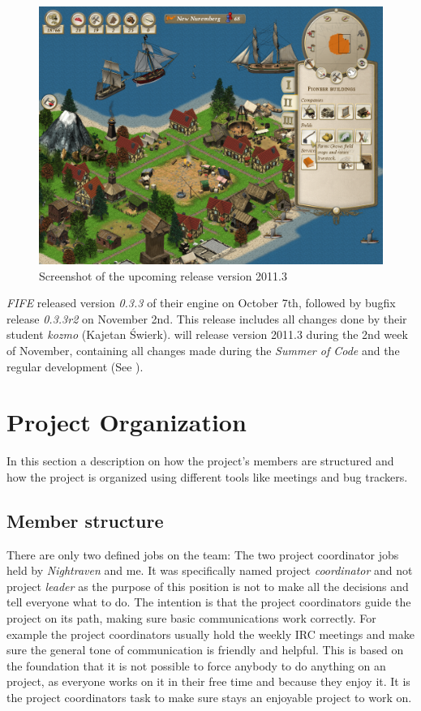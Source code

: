 \begin{figure}[!htb]
	\begin{center}
		\includegraphics[scale=0.28]{pics/uhscreenshot}
	\end{center}
    \caption{Screenshot of the upcoming \UH{} release version 2011.3}
    \label{uhscreenshot}
\end{figure}

\textit{FIFE} released version \textit{0.3.3} of their engine on October 7th,
followed by bugfix release \textit{0.3.3r2} on November 2nd. This release includes all changes done by their student
\textit{kozmo} (Kajetan Świerk). \UH{} will release \UH{} version 2011.3 during the 2nd week of November, containing all
changes made during the \textit{Summer of Code} and the regular development (See ).


\section{Project Organization}
In this section a description on how the project's members are structured and how the project is organized using
different tools like meetings and bug trackers.

\subsection{Member structure}
There are only two defined jobs on the team: The two project coordinator jobs held by \textit{Nightraven} and me. It was
specifically named project \textit{coordinator} and not project \textit{leader} as the purpose of this position is not to
make all the decisions and tell everyone what to do. The intention is that the project coordinators guide the project on
its path, making sure basic communications work correctly. For example the project coordinators usually hold the weekly
IRC meetings and make sure the general tone of communication is friendly and helpful. This is based on the foundation
that it is not possible to force anybody to do anything on an \OS{} project, as everyone works on it in their free time
and because they enjoy it. It is the project coordinators task to make sure stays an enjoyable project to work on.

